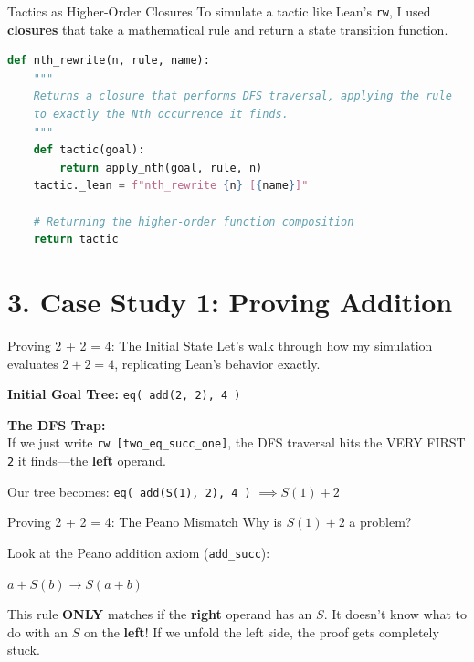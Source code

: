 \documentclass[aspectratio=169, 10pt]{beamer}
\begin{document}
\begin{frame}[fragile]{Tactics as Higher-Order Closures}
    To simulate a tactic like Lean's \texttt{rw}, I used \textbf{closures} that take a mathematical rule and return a state transition function.
    
\begin{lstlisting}[language=Python]
def nth_rewrite(n, rule, name):
    """
    Returns a closure that performs DFS traversal, applying the rule 
    to exactly the Nth occurrence it finds.
    """
    def tactic(goal):
        return apply_nth(goal, rule, n)
    tactic._lean = f"nth_rewrite {n} [{name}]"
    
    # Returning the higher-order function composition
    return tactic   
\end{lstlisting}
\end{frame}


\section{3. Case Study 1: Proving Addition}

\begin{frame}[fragile]{Proving 2 + 2 = 4: The Initial State}
    Let's walk through how my simulation evaluates $2 + 2 = 4$, replicating Lean's behavior exactly.
    
    \vspace{1em}
    \textbf{Initial Goal Tree:} 
    \texttt{eq( add(2, 2), 4 )}
    
    \vspace{1em}
    \textbf{The DFS Trap:} \\
    If we just write \texttt{rw [two\_eq\_succ\_one]}, the DFS traversal hits the VERY FIRST \texttt{2} it finds—the \textbf{left} operand.
    
    Our tree becomes: \texttt{eq( add(S(1), 2), 4 )} $\implies S(1) + 2$
\end{frame}

\begin{frame}[fragile]{Proving 2 + 2 = 4: The Peano Mismatch}
    Why is $S(1) + 2$ a problem?
    
    \vspace{1em}
    Look at the Peano addition axiom (\texttt{add\_succ}):
    \begin{center}
    \Large $a + S(b) \rightarrow S(a + b)$
    \end{center}
    
    \vspace{1em}
    This rule \textbf{ONLY} matches if the \textbf{right} operand has an $S$. It doesn't know what to do with an $S$ on the \textbf{left}! If we unfold the left side, the proof gets completely stuck.
\end{frame}
\end{document}
